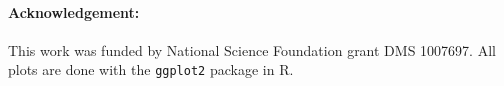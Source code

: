 \documentclass[12]{article}
\begin{document}
%
%

\paragraph{Acknowledgement:}

This work was funded by National Science Foundation grant DMS 1007697. All plots are done with the {\tt ggplot2} \citep{hadley:2009} package in R.


%

%

\end{document}
